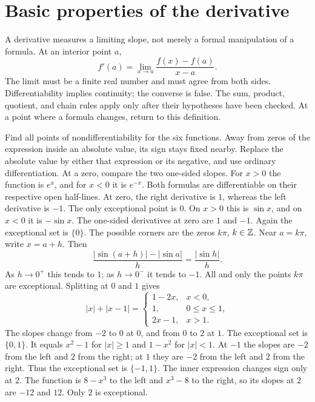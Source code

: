 \section{Basic properties of the derivative}
A derivative measures a limiting slope, not merely a formal manipulation of a formula. At an interior point $a$,
\[
 f'(a)=\lim_{x\to a}\frac{f(x)-f(a)}{x-a}.
\]
The limit must be a finite real number and must agree from both sides. Differentiability implies continuity; the converse is false. The sum, product, quotient, and chain rules apply only after their hypotheses have been checked. At a point where a formula changes, return to this definition.

\goal Find all points of nondifferentiability for the six functions.
\idea Away from zeros of the expression inside an absolute value, its sign stays fixed nearby. Replace the absolute value by either that expression or its negative, and use ordinary differentiation. At a zero, compare the two one-sided slopes.
For $x>0$ the function is $e^x$, and for $x<0$ it is $e^{-x}$. Both formulas are differentiable on their respective open half-lines. At zero, the right derivative is $1$, whereas the left derivative is $-1$. The only exceptional point is $0$.
On $x>0$ this is $\sin x$, and on $x<0$ it is $-\sin x$. The one-sided derivatives at zero are $1$ and $-1$. Again the exceptional set is $\{0\}$.
The possible corners are the zeros $k\pi$, $k\in\mathbb{Z}$. Near $a=k\pi$, write $x=a+h$. Then
\[
 \frac{|\sin(a+h)|-|\sin a|}{h}=\frac{|\sin h|}{h}.
\]
As $h\to0^+$ this tends to $1$; as $h\to0^-$ it tends to $-1$. All and only the points $k\pi$ are exceptional.
Splitting at $0$ and $1$ gives
\[
 |x|+|x-1|=\begin{cases}1-2x,&x<0,\\1,&0\le x\le1,\\2x-1,&x>1.\end{cases}
\]
The slopes change from $-2$ to $0$ at $0$, and from $0$ to $2$ at $1$. The exceptional set is $\{0,1\}$.
It equals $x^2-1$ for $|x|\ge1$ and $1-x^2$ for $|x|<1$. At $-1$ the slopes are $-2$ from the left and $2$ from the right; at $1$ they are $-2$ from the left and $2$ from the right. Thus the exceptional set is $\{-1,1\}$.
The inner expression changes sign only at $2$. The function is $8-x^3$ to the left and $x^3-8$ to the right, so its slopes at $2$ are $-12$ and $12$. Only $2$ is exceptional.

